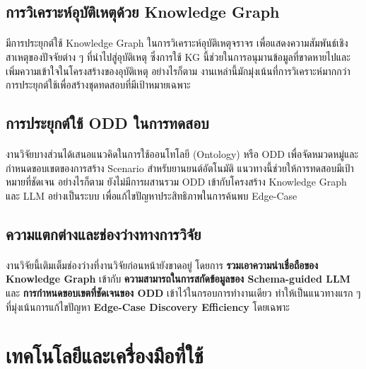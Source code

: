\subsection{การวิเคราะห์อุบัติเหตุด้วย Knowledge Graph}\paragraph{}

มีการประยุกต์ใช้ Knowledge Graph ในการวิเคราะห์อุบัติเหตุจราจร เพื่อแสดงความสัมพันธ์เชิงสาเหตุของปัจจัยต่าง ๆ ที่นำไปสู่อุบัติเหตุ \cite{liyan2022analysis} ซึ่งการใช้ KG นี้ช่วยในการอนุมานข้อมูลที่ขาดหายไปและเพิ่มความเข้าใจในโครงสร้างของอุบัติเหตุ อย่างไรก็ตาม งานเหล่านี้มักมุ่งเน้นที่การวิเคราะห์มากกว่าการประยุกต์ใช้เพื่อสร้างชุดทดสอบที่มีเป้าหมายเฉพาะ

\subsection{การประยุกต์ใช้ ODD ในการทดสอบ}\paragraph{}

งานวิจัยบางส่วนได้เสนอแนวคิดในการใช้ออนโทโลยี (Ontology) หรือ ODD เพื่อจัดหมวดหมู่และกำหนดขอบเขตของการสร้าง Scenario สำหรับยานยนต์อัตโนมัติ \cite{bagschik2018ontology} แนวทางนี้ช่วยให้การทดสอบมีเป้าหมายที่ชัดเจน อย่างไรก็ตาม ยังไม่มีการผสานรวม ODD เข้ากับโครงสร้าง Knowledge Graph และ LLM อย่างเป็นระบบ เพื่อแก้ไขปัญหาประสิทธิภาพในการค้นพบ Edge-Case

\subsection{ความแตกต่างและช่องว่างทางการวิจัย}\paragraph{}

งานวิจัยนี้เติมเต็มช่องว่างที่งานวิจัยก่อนหน้ายังขาดอยู่ โดยการ \textbf{รวมเอาความน่าเชื่อถือของ Knowledge Graph} เข้ากับ \textbf{ความสามารถในการสกัดข้อมูลของ Schema-guided LLM} และ \textbf{การกำหนดขอบเขตที่ชัดเจนของ ODD} เข้าไว้ในกรอบการทำงานเดียว ทำให้เป็นแนวทางแรก ๆ ที่มุ่งเน้นการแก้ไขปัญหา \textbf{Edge-Case Discovery Efficiency} โดยเฉพาะ

\section{เทคโนโลยีและเครื่องมือที่ใช้}

